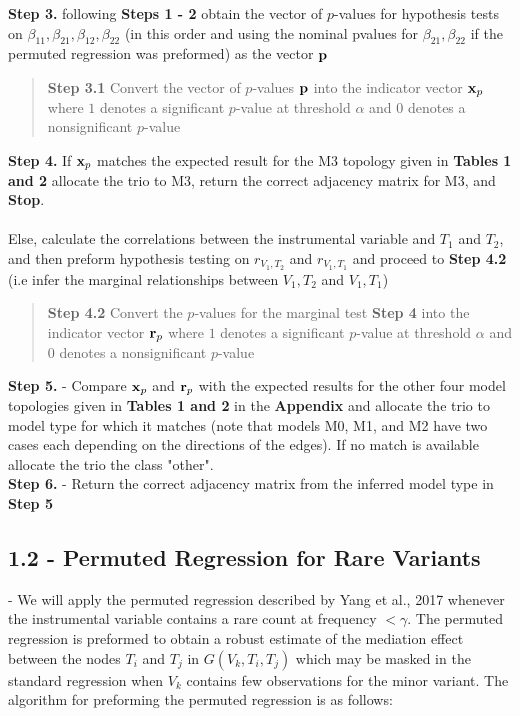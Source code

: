 \documentclass[12pt]{report}
\begin{document}
\noindent \textbf{Step 3.} following \textbf{Steps 1 - 2} obtain the vector of $p$-values for hypothesis tests on $\beta_{11}, \beta_{21}, \beta_{12}, \beta_{22}$ (in this order and using the nominal pvalues for $\beta_{21}, \beta_{22}$ if the permuted regression was preformed) as the vector $\bf {p}$\\

\begin{quote}
\textbf{Step 3.1} Convert the vector of $p$-values $\bf {p}$ into the indicator vector ${\bf x}_p$ where $1$ denotes a significant $p$-value at threshold $\alpha$ and $0$ denotes a nonsignificant $p$-value \\
\end{quote}


\noindent \textbf{Step 4.} If ${\bf x}_p$ matches the expected result for the M3 topology given in \textbf{Tables 1 and 2} allocate the trio to M3, return the correct adjacency matrix for M3, and \textbf{Stop}. \\
\\
Else, calculate the correlations between the instrumental variable and $T_1$ and $T_2$, and then preform hypothesis testing on $r_{V_1,T_2}$ and $r_{V_1, T_1}$ and proceed to \textbf{Step 4.2} (i.e infer the marginal relationships between $V_1,T_2$ and $V_1, T_1$) \\


\begin{quote}
\noindent \textbf{Step 4.2} Convert the $p$-values for the marginal test \textbf{Step 4} into the indicator vector ${\bf r}_p$  where $1$ denotes a significant $p$-value at threshold $\alpha$ and $0$ denotes a nonsignificant $p$-value \\
\end{quote}


\noindent\textbf{Step 5.} - Compare ${\bf x}_p$ and ${\bf r}_p$ with the expected results for the other four model topologies given in \textbf{Tables 1 and 2} in the \textbf{Appendix} and allocate the trio to model type for which it matches (note that models M0, M1, and M2 have two cases each depending on the directions of the edges). If no match is available allocate the trio the class "other". \\

\noindent\textbf{Step 6.} - Return the correct adjacency matrix from the inferred model type in \textbf{Step 5}


\subsection*{1.2 - Permuted Regression for Rare Variants} - We will apply the permuted regression described by Yang et al., 2017 whenever the instrumental variable contains a rare count at frequency $< \gamma$. The permuted regression is preformed to obtain a robust estimate of the mediation effect between the nodes $T_i$ and $T_j$ in $G(V_k, T_i, T_j)$ which may be masked in the standard regression when $V_k$ contains few observations for the minor variant. The algorithm for preforming the permuted regression is as follows:\\
\end{document}
